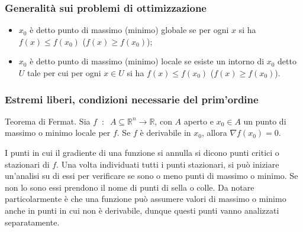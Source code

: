 \subsubsection*{Generalità sui problemi di ottimizzazione}
\begin{itemize}
    \item $x_0$ è detto punto di massimo (minimo) globale se per ogni $x$ si ha $f(x) \leq f(x_0)$ ($f(x) \geq f(x_0)$);
    \item $x_0$ è detto punto di massimo (minimo) locale se esiste un intorno di $x_0$ detto $U$ tale per cui per ogni $x \in U$ si ha $f(x) \leq f(x_0)$ ($f(x) \geq f(x_0)$).
\end{itemize}
\subsubsection*{Estremi liberi, condizioni necessarie del prim'ordine}
Teorema di Fermat. Sia $f \;\;:\;\; A \subseteq \mathbb{R}^n \rightarrow \mathbb{R}$, con $A$ aperto e $x_0 \in A$ un punto di massimo o minimo locale per $f$. Se $f$ è derivabile in $x_0$, allora $\nabla f(x_0) = 0$.\newline

I punti in cui il gradiente di una funzione si annulla si dicono punti critici o stazionari di $f$. Una volta individuati tutti i punti stazionari, si può iniziare un'analisi su di essi per verificare se sono o meno punti di massimo o minimo. Se non lo sono essi prendono il nome di punti di sella o colle. Da notare particolarmente è che una funzione può assumere valori di massimo o minimo anche in punti in cui non è derivabile, dunque questi punti vanno analizzati separatamente.
